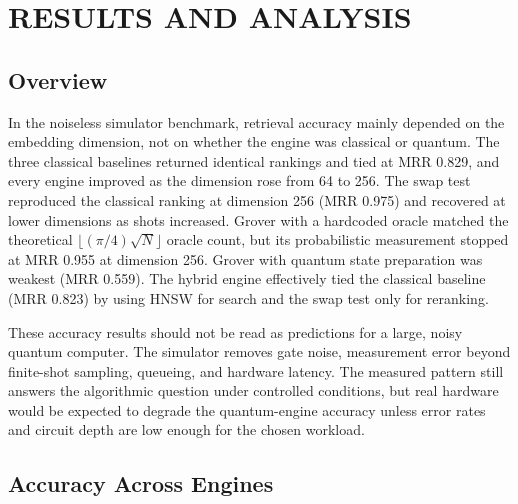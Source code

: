 \chapter{RESULTS AND ANALYSIS}
\label{ch:results}


\section{Overview}
\label{sec:results:overview}

In the noiseless simulator benchmark, retrieval accuracy mainly depended on the
embedding dimension, not on whether the engine was classical or quantum. The
three classical baselines returned identical rankings and tied at MRR 0.829, and
every engine improved as the dimension rose from 64 to 256. The swap test
reproduced the classical ranking at dimension 256 (MRR 0.975) and recovered at
lower dimensions as shots increased. Grover with a hardcoded oracle matched the
theoretical $\lfloor(\pi/4)\sqrt{N}\rfloor$ oracle count, but its probabilistic
measurement stopped at MRR 0.955 at dimension 256. Grover with quantum state
preparation was weakest (MRR 0.559). The hybrid engine effectively tied the
classical baseline (MRR 0.823) by using HNSW for search and the swap test only
for reranking.

These accuracy results should not be read as predictions for a large, noisy
quantum computer. The simulator removes gate noise, measurement error beyond
finite-shot sampling, queueing, and hardware latency. The measured pattern still
answers the algorithmic question under controlled conditions, but real hardware
would be expected to degrade the quantum-engine accuracy unless error rates and
circuit depth are low enough for the chosen workload.

\section{Accuracy Across Engines}
\label{sec:results:mrr}


